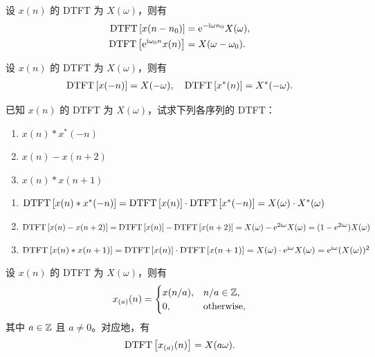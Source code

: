 \begin{property}
    设 $x(n)$ 的 DTFT 为 $X(\omega)$，则有
    \begin{align*}
        \mathrm{DTFT}\left[x(n - n_0)\right] & = \mathrm{e}^{-\mathrm{i}\omega n_0}X(\omega), \\
        \mathrm{DTFT}\left[\mathrm{e}^{\mathrm{i}\omega_0 n}x(n)\right] & = X(\omega - \omega_0).
    \end{align*}
\end{property}

\begin{property}
    设 $x(n)$ 的 DTFT 为 $X(\omega)$，则有
    \begin{align*}
        \mathrm{DTFT}\left[x(-n)\right] = X(-\omega), \quad \mathrm{DTFT}\left[x^*(n)\right] = X^*(-\omega).
    \end{align*}
\end{property}

\begin{exercise}
    已知 $x(n)$ 的 DTFT 为 $X(\omega)$，试求下列各序列的 DTFT：
    \begin{enumerate}[label=(\arabic*)]
        \item $x(n) * x^*(-n)$
        \item $x(n) - x(n + 2)$
        \item $x(n) * x(n + 1)$
    \end{enumerate}
\end{exercise}

\begin{solution}
    \begin{enumerate}[label=(\arabic*)]
        \item $\mathrm{DTFT}\left[x(n) * x^*(-n)\right] = \mathrm{DTFT}\left[x(n)\right] \cdot \mathrm{DTFT}\left[x^*(-n)\right]
            = X(\omega) \cdot X^*(\omega)$
        \item $\mathrm{DTFT}\left[x(n) - x(n + 2)\right] = \mathrm{DTFT}\left[x(n)\right] - \mathrm{DTFT}\left[x(n + 2)\right]
            = X(\omega) - \mathrm{e}^{2\mathrm{i}\omega}X(\omega)
            = (1 - \mathrm{e}^{2\mathrm{i}\omega})X(\omega)$
        \item $\mathrm{DTFT}\left[x(n) * x(n + 1)\right] = \mathrm{DTFT}\left[x(n)\right] \cdot \mathrm{DTFT}\left[x(n + 1)\right]
            = X(\omega) \cdot \mathrm{e}^{\mathrm{i}\omega}X(\omega)
            = \mathrm{e}^{\mathrm{i}\omega}(X(\omega))^2$
    \end{enumerate}
\end{solution}

\begin{property}
    设 $x(n)$ 的 DTFT 为 $X(\omega)$，则有
    \begin{align*}
        x_{(a)}(n) = \begin{cases}
            x(n/a), & n/a \in \mathbb{Z}, \\
            0, & \text{otherwise},
        \end{cases}
    \end{align*}
    其中 $a \in \mathbb{Z}$ 且 $a \neq 0$。对应地，有
    \begin{align*}
        \mathrm{DTFT}\left[x_{(a)}(n)\right] = X(a\omega).
    \end{align*}
\end{property}

